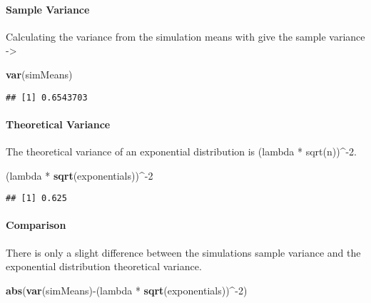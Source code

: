 \documentclass[]{article}
\newenvironment{Shaded}{\begin{snugshade}}{\end{snugshade}}
\newcommand{\KeywordTok}[1]{\textcolor[rgb]{0.13,0.29,0.53}{\textbf{{#1}}}}
\newcommand{\DecValTok}[1]{\textcolor[rgb]{0.00,0.00,0.81}{{#1}}}
\newcommand{\StringTok}[1]{\textcolor[rgb]{0.31,0.60,0.02}{{#1}}}
\newcommand{\NormalTok}[1]{{#1}}
\let\oldparagraph\paragraph
\renewcommand{\paragraph}[1]{\oldparagraph{#1}\mbox{}}
\begin{document}
\paragraph{Sample Variance}\label{sample-variance}

Calculating the variance from the simulation means with give the sample
variance -\textgreater{}

\begin{Shaded}
\begin{Highlighting}[]
\KeywordTok{var}\NormalTok{(simMeans)}
\end{Highlighting}
\end{Shaded}

\begin{verbatim}
## [1] 0.6543703
\end{verbatim}

\paragraph{Theoretical Variance}\label{theoretical-variance}

The theoretical variance of an exponential distribution is (lambda *
sqrt(n))\^{}-2.

\begin{Shaded}
\begin{Highlighting}[]
\NormalTok{(lambda *}\StringTok{ }\KeywordTok{sqrt}\NormalTok{(exponentials))^-}\DecValTok{2}
\end{Highlighting}
\end{Shaded}

\begin{verbatim}
## [1] 0.625
\end{verbatim}

\paragraph{Comparison}\label{comparison-1}

There is only a slight difference between the simulations sample
variance and the exponential distribution theoretical variance.

\begin{Shaded}
\begin{Highlighting}[]
\KeywordTok{abs}\NormalTok{(}\KeywordTok{var}\NormalTok{(simMeans)-(lambda *}\StringTok{ }\KeywordTok{sqrt}\NormalTok{(exponentials))^-}\DecValTok{2}\NormalTok{)}
\end{Highlighting}
\end{Shaded}
\end{document}
